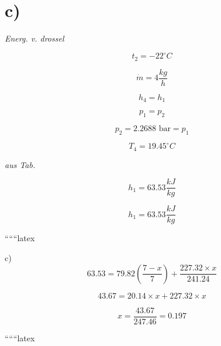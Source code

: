 

\section*{c)}

\textit{Energ. v. drossel}

\[
t_2 = -22^\circ C
\]

\[
\dot{m} = 4 \frac{kg}{h}
\]

\[
h_4 = h_1
\]

\[
p_1 = p_2
\]

\[
p_2 = 2.2688 \text{ bar} = p_1
\]

\[
T_4 = 19.45^\circ C
\]

\textit{aus Tab.}

\[
h_1 = 63.53 \frac{kJ}{kg}
\]

\[
h_1 = 63.53 \frac{kJ}{kg}
\]

``````latex

c)
\[
63.53 = 79.82 \left( \frac{7 - x}{7} \right) + \frac{227.32 \times x}{241.24}
\]

\[
43.67 = 20.14 \times x + 227.32 \times x
\]

\[
x = \frac{43.67}{247.46} = 0.197
\]

``````latex